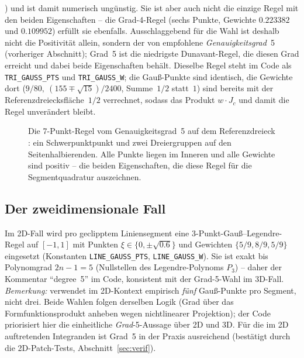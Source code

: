 \documentclass[a4paper,11pt]{article}
\def\tfrac#1#2{#1/#2}%
\newcommand{\code}[1]{\texttt{\small #1}}
\begin{document}
\citealp[S.~1140]{dunavant1985}) und ist damit numerisch ungünstig. Sie ist aber auch nicht die
einzige Regel mit den beiden Eigenschaften -- die Grad-4-Regel (sechs Punkte, Gewichte
$0.223382$ und $0.109952$) erfüllt sie ebenfalls. Ausschlaggebend für die Wahl ist deshalb nicht
die Positivität allein, sondern der von \citet{farah2015} empfohlene \emph{Genauigkeitsgrad}~5
(vorheriger Abschnitt); Grad~5 ist die niedrigste Dunavant-Regel, die diesen Grad erreicht und
dabei beide Eigenschaften behält. Dieselbe Regel steht im Code als \code{TRI\_GAUSS\_PTS} und
\code{TRI\_GAUSS\_W}; die Gauß-Punkte sind identisch, die Gewichte dort
($9/80,\ (155\mp\sqrt{15})/2400$, Summe~$\tfrac12$ statt~$1$) sind bereits mit der
Referenzdreiecksfläche~$\tfrac12$ verrechnet, sodass das Produkt $w\cdot J_c$ und damit die Regel
unverändert bleibt.

\begin{figure}[htbp]
\centering
{}
\caption[7-Punkt-Regel vom Genauigkeitsgrad 5 auf dem Referenzdreieck]{Die 7-Punkt-Regel vom
Genauigkeitsgrad~5 auf dem Referenzdreieck \citep{dunavant1985}: ein Schwerpunktpunkt und zwei
Dreiergruppen auf den Seitenhalbierenden. Alle Punkte liegen im Inneren und alle Gewichte sind
positiv -- die beiden Eigenschaften, die diese Regel für die Segmentquadratur auszeichnen.}
\label{fig:dunavant}
\end{figure}

\subsection{Der zweidimensionale Fall}
Im 2D-Fall wird pro geclipptem Liniensegment eine 3-Punkt-Gauß--Legendre-Regel auf $[-1,1]$ mit
Punkten $\xi\in\{0,\pm\sqrt{0.6}\}$ und Gewichten $\{5/9,8/9,5/9\}$ eingesetzt (Konstanten
\code{LINE\_GAUSS\_PTS}, \code{LINE\_GAUSS\_W}). Sie ist exakt bis Polynomgrad $2n-1=5$ (Nullstellen des
Legendre-Polynoms $P_3$) -- daher der Kommentar ``degree~5'' im Code, konsistent mit der Grad-5-Wahl
im 3D-Fall. \emph{Bemerkung:} \citet{farah} verwendet im 2D-Kontext empirisch \emph{fünf}
Gauß-Punkte pro Segment, nicht drei. Beide Wahlen folgen derselben Logik (Grad über das
Formfunktionsprodukt anheben wegen nichtlinearer Projektion); der Code priorisiert hier die
einheitliche \emph{Grad}-5-Aussage über 2D und 3D. Für die im 2D auftretenden Integranden ist Grad~5
in der Praxis ausreichend (bestätigt durch die 2D-Patch-Tests, Abschnitt~\ref{sec:verif}).
\end{document}
